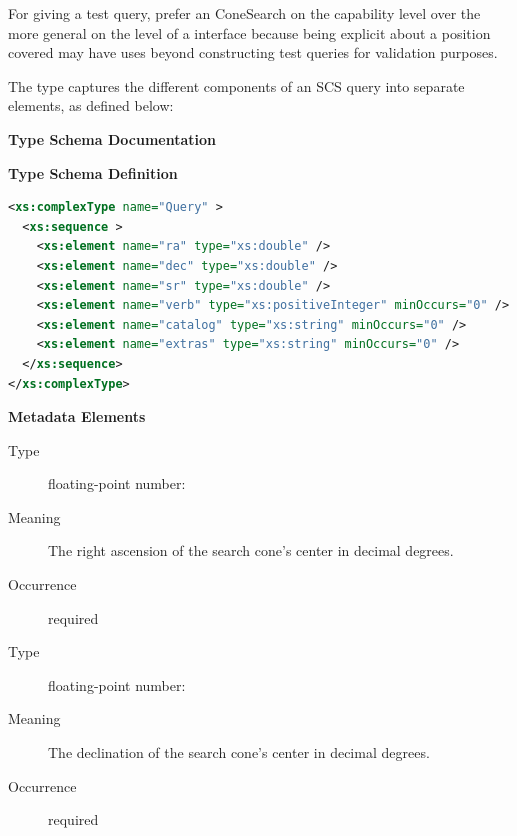 \documentclass[11pt,a4paper]{ivoa}
\begin{document}
For giving a test query, prefer an ConeSearch  on the
capability level over the more general  on the level of
a  interface because being explicit about a position
covered may have uses beyond constructing test queries for validation
purposes.

The  type captures the different components of an SCS
query into separate elements, as defined below:

\begin{generated}
\begingroup
        \renewcommand*\descriptionlabel[1]{%
        \hbox to 5.5em{\emph{#1}\hfil}}\vspace{2ex}\noindent\textbf{ Type Schema Documentation}


\vspace{1ex}\noindent\textbf{ Type Schema Definition}

\begin{lstlisting}[language=XML,basicstyle=\footnotesize]
<xs:complexType name="Query" >
  <xs:sequence >
    <xs:element name="ra" type="xs:double" />
    <xs:element name="dec" type="xs:double" />
    <xs:element name="sr" type="xs:double" />
    <xs:element name="verb" type="xs:positiveInteger" minOccurs="0" />
    <xs:element name="catalog" type="xs:string" minOccurs="0" />
    <xs:element name="extras" type="xs:string" minOccurs="0" />
  </xs:sequence>
</xs:complexType>
\end{lstlisting}

\vspace{0.5ex}\noindent\textbf{ Metadata Elements}

\begingroup\small\begin{bigdescription}\item[Element \xmlel{ra}]
\begin{description}
\item[Type] floating-point number: 
\item[Meaning] The right ascension of the search cone's center in
                   decimal degrees.
\item[Occurrence] required

\end{description}
\item[Element \xmlel{dec}]
\begin{description}
\item[Type] floating-point number: 
\item[Meaning] The declination of the search cone's center in
                   decimal degrees.
\item[Occurrence] required


\end{description}
\end{bigdescription}
\end{generated}
\end{document}
